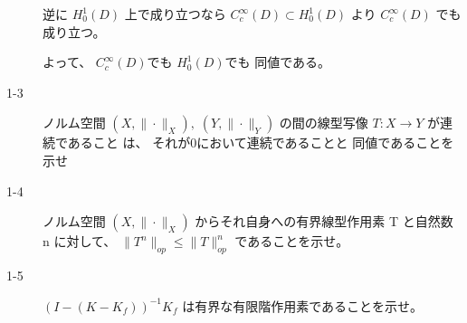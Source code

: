 \documentclass[12pt,b5paper]{ltjsarticle}
\begin{document}
\begin{description}
            逆に
            $H_{0}^{1}(D)$
            上で成り立つなら
            $C_{c}^{\infty}(D) \subset H_{0}^{1}(D)$
            より
            $C_{c}^{\infty}(D)$
            でも成り立つ。

            よって、
            $C_{c}^{\infty}(D)$でも
            $H_{0}^{1}(D)$でも
            同値である。


            \hrulefill


 \item[1-3]
            ノルム空間
            $(X,\|\cdot\|_{X}),\;(Y,\|\cdot\|_{Y})$
            の間の線型写像
            $T:X\to Y$
            が連続であること
            は、
            それが0において連続であることと
            同値であることを示せ

            \dotfill


            \hrulefill

 \item[1-4]
            ノルム空間
            $(X,\|\cdot\|_{X})$
            からそれ自身への有界線型作用素 T と自然数 n に対して、
            $\|T^{n}\|_{op} \leq \|T\|_{op}^{n}$
            であることを示せ。


            \dotfill


            \hrulefill


 \item[1-5]
            $(I-(K-K_{f}))^{-1}K_{f}$
            は有界な有限階作用素であることを示せ。

            \dotfill


            \hrulefill


\end{description}

\hrulefill
\end{document}
